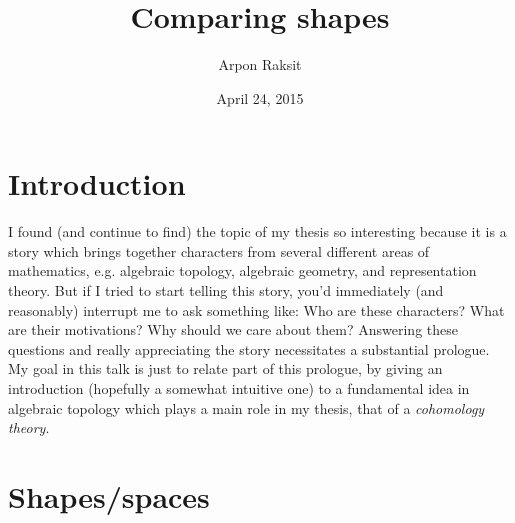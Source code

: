 

\title{Comparing shapes}
\author{Arpon Raksit}
\date{April 24, 2015}


\maketitle


\section{Introduction}

I found (and continue to find) the topic of my thesis so interesting
because it is a story which brings together characters from several
different areas of mathematics, e.g. algebraic topology, algebraic
geometry, and representation theory. But if I tried to start telling
this story, you'd immediately (and reasonably) interrupt me to ask
something like: Who are these characters? What are their motivations?
Why should we care about them? Answering these questions and really
appreciating the story necessitates a substantial prologue. My goal in
this talk is just to relate part of this prologue, by giving an
introduction (hopefully a somewhat intuitive one) to a fundamental
idea in algebraic topology which plays a main role in my thesis, that
of a \emph{cohomology theory}.



\section{Shapes/spaces}

